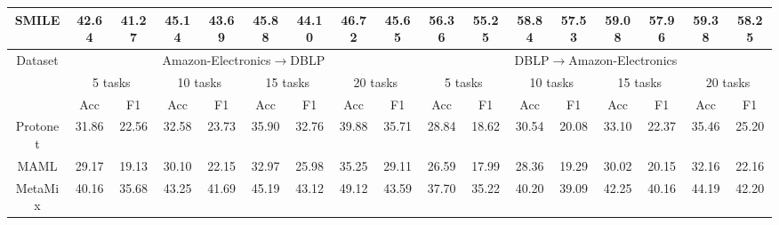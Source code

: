 \begin{table*}[ht]
{\begin{tabular}{@{}c|cccccccc|cccccccc@{}}
SMILE                    & \textbf{42.64} & \textbf{41.27} & \textbf{45.14} & \textbf{43.69} & \textbf{45.88} & \textbf{44.10} & \textbf{46.72} & \textbf{45.65} & \textbf{56.36} & \textbf{55.25} & \textbf{58.84} & \textbf{57.53} & \textbf{59.08} & \textbf{57.96} & \textbf{59.38} & \textbf{58.25} \\ \midrule
\multirow{3}{*}{Dataset} & \multicolumn{8}{c|}{Amazon-Electronics$\rightarrow$DBLP}                                                                            & \multicolumn{8}{c}{DBLP$\rightarrow$Amazon-Electronics}                                                                             \\ \cmidrule(l){2-17} 
                         & \multicolumn{2}{c}{5 tasks}     & \multicolumn{2}{c}{10 tasks}    & \multicolumn{2}{c}{15 tasks}    & \multicolumn{2}{c|}{20 tasks}   & \multicolumn{2}{c}{5 tasks}     & \multicolumn{2}{c}{10 tasks}    & \multicolumn{2}{c}{15 tasks}    & \multicolumn{2}{c}{20 tasks}    \\ \cmidrule(l){2-17} 
                         & Acc            & F1             & Acc            & F1             & Acc            & F1             & Acc            & F1             & Acc            & F1             & Acc            & F1             & Acc            & F1             & Acc            & F1             \\ \midrule
Protonet                 & 31.86          & 22.56          & 32.58          & 23.73          & 35.90          & 32.76          & 39.88          & 35.71          & 28.84          & 18.62          & 30.54          & 20.08          & 33.10          & 22.37          & 35.46          & 25.20          \\
MAML                     & 29.17          & 19.13          & 30.10          & 22.15          & 32.97          & 25.98          & 35.25          & 29.11          & 26.59          & 17.99          & 28.36          & 19.29          & 30.02          & 20.15          & 32.16          & 22.16          \\ \midrule
MetaMix                   & 40.16          & 35.68           & 43.25          & 41.69          & 45.19          & 43.12          & 49.12          & 43.59          & 37.70          & 35.22          & 40.20          & 39.09          & 42.25         & 40.16          & 44.19          & 42.20          \\

\end{tabular}}
\end{table*}
